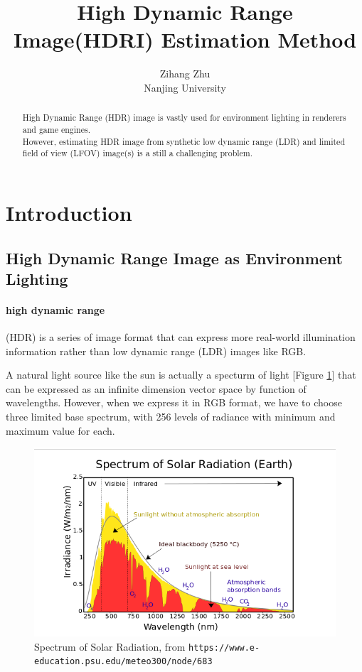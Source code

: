 \documentclass{article}
\title{High Dynamic Range Image(HDRI) Estimation Method }
\author{
    \hspace{1mm}Zihang Zhu \\
    Nanjing University
}
\begin{document}
\maketitle

\begin{abstract}
    High Dynamic Range (HDR) image is vastly used for environment lighting in renderers and game engines. \\
    However, estimating HDR image from synthetic low dynamic range (LDR) and limited field of view (LFOV) image(s) is a still a challenging problem.
\end{abstract}


\section{Introduction}

\subsection{High Dynamic Range Image as Environment Lighting}

\paragraph{high dynamic range} (HDR) is a series of image format that can express
more real-world illumination information rather than low dynamic range (LDR) images like RGB.

A natural light source like the sun is actually a specturm of light [Figure \ref{fig:spectrum-of-solar-radiation}] that can be
expressed as an infinite dimension vector space by function of wavelengths.
However, when we express it in RGB format, we have to choose three limited base spectrum,
with 256 levels of radiance with minimum and maximum value for each.

\begin{figure}
    \centering
    \includegraphics[width=0.8\linewidth]{spectrum-of-solar-radiation.png}
    \caption{Spectrum of Solar Radiation, from \texttt{https://www.e-education.psu.edu/meteo300/node/683}}
    \label{fig:spectrum-of-solar-radiation}
\end{figure}
\end{document}
